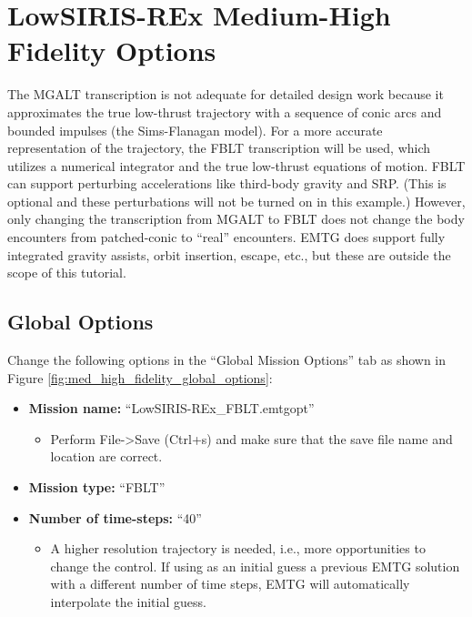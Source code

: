 \documentclass[11pt]{article}
\begin{document}
\section{LowSIRIS-REx Medium-High Fidelity Options}
\label{sec:LowSIRIS-REX_med_high_fidelity}

The \ac{MGALT} transcription is not adequate for detailed design work because it approximates the true low-thrust trajectory with a sequence of conic arcs and bounded impulses (the Sims-Flanagan model). For a more accurate representation of the trajectory,  the \ac{FBLT} transcription will be used, which utilizes a numerical integrator and the true low-thrust equations of motion. \ac{FBLT} can support perturbing accelerations like third-body gravity and \ac{SRP}. (This is optional and these perturbations will not be turned on in this example.) However, only changing the transcription from \ac{MGALT} to \ac{FBLT} does not change the body encounters from patched-conic to “real” encounters. \ac{EMTG} does support fully integrated gravity assists, orbit insertion, escape, etc., but these are outside the scope of this tutorial.

\subsection{Global Options}
\label{sec:med_high_fidelity_global_options}

Change the following options in the ``Global Mission Options'' tab as shown in Figure \ref{fig:med_high_fidelity_global_options}:

\begin{itemize}
	\item \textbf{Mission name:} ``LowSIRIS-REx\_FBLT.emtgopt''
	\begin{itemize}
		\item Perform File-\textgreater Save (Ctrl+s) and make sure that the save file name and location are correct.
	\end{itemize}
	\item \textbf{Mission type:} ``\ac{FBLT}''
	\item \textbf{Number of time-steps:} ``40''
	\begin{itemize}
		\item A higher resolution trajectory is needed, i.e., more opportunities to change the control. If using as an initial guess a previous EMTG solution with a different number of time steps, EMTG will automatically interpolate the initial guess.
	\end{itemize}
\end{itemize}
\end{document}
